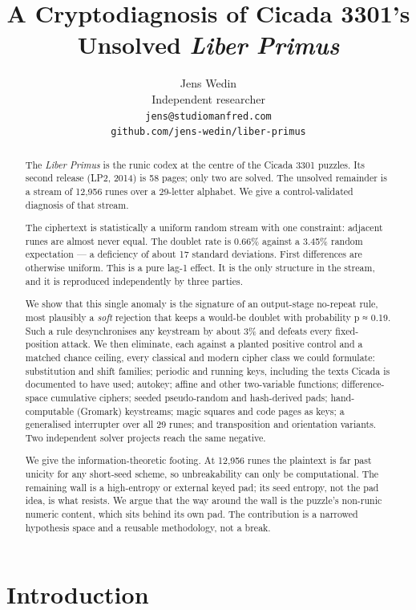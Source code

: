 \documentclass[11pt]{article}
\title{A Cryptodiagnosis of Cicada 3301's Unsolved \emph{Liber Primus}}
\author{Jens Wedin \\
  Independent researcher \\
  {\tt jens@studiomanfred.com} \\
  {\tt github.com/jens-wedin/liber-primus} \\}
\date{}
\begin{document}
\maketitle

\begin{abstract}
The \emph{Liber Primus} is the runic codex at the centre of the Cicada 3301 puzzles. Its second release (LP2, 2014) is 58 pages; only two are solved. The unsolved remainder is a stream of 12,956 runes over a 29-letter alphabet. We give a control-validated diagnosis of that stream.

The ciphertext is statistically a uniform random stream with one constraint: adjacent runes are almost never equal. The doublet rate is 0.66\% against a 3.45\% random expectation --- a deficiency of about 17 standard deviations. First differences are otherwise uniform. This is a pure lag-1 effect. It is the only structure in the stream, and it is reproduced independently by three parties.

We show that this single anomaly is the signature of an output-stage no-repeat rule, most plausibly a \emph{soft} rejection that keeps a would-be doublet with probability p ≈ 0.19. Such a rule desynchronises any keystream by about 3\% and defeats every fixed-position attack. We then eliminate, each against a planted positive control and a matched chance ceiling, every classical and modern cipher class we could formulate: substitution and shift families; periodic and running keys, including the texts Cicada is documented to have used; autokey; affine and other two-variable functions; difference-space cumulative ciphers; seeded pseudo-random and hash-derived pads; hand-computable (Gromark) keystreams; magic squares and code pages as keys; a generalised interrupter over all 29 runes; and transposition and orientation variants. Two independent solver projects reach the same negative.

We give the information-theoretic footing. At 12,956 runes the plaintext is far past unicity for any short-seed scheme, so unbreakability can only be computational. The remaining wall is a high-entropy or external keyed pad; its seed entropy, not the pad idea, is what resists. We argue that the way around the wall is the puzzle's non-runic numeric content, which sits behind its own pad. The contribution is a narrowed hypothesis space and a reusable methodology, not a break.
\end{abstract}

\section{Introduction}
\end{document}
